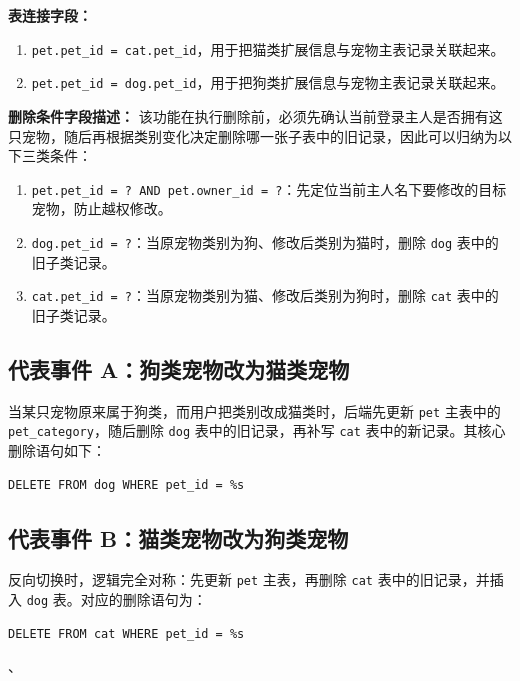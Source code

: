 \documentclass[12pt,a4paper,fontset=none]{ctexart}
\begin{document}
\textbf{表连接字段：}
\begin{enumerate}
    \item \texttt{pet.pet\_id = cat.pet\_id}，用于把猫类扩展信息与宠物主表记录关联起来。
    \item \texttt{pet.pet\_id = dog.pet\_id}，用于把狗类扩展信息与宠物主表记录关联起来。
\end{enumerate}

\textbf{删除条件字段描述：} 该功能在执行删除前，必须先确认当前登录主人是否拥有这只宠物，随后再根据类别变化决定删除哪一张子表中的旧记录，因此可以归纳为以下三类条件：
\begin{enumerate}
    \item \texttt{pet.pet\_id = ? AND pet.owner\_id = ?}：先定位当前主人名下要修改的目标宠物，防止越权修改。
    \item \texttt{dog.pet\_id = ?}：当原宠物类别为狗、修改后类别为猫时，删除 \texttt{dog} 表中的旧子类记录。
    \item \texttt{cat.pet\_id = ?}：当原宠物类别为猫、修改后类别为狗时，删除 \texttt{cat} 表中的旧子类记录。
\end{enumerate}

\subsection{代表事件 A：狗类宠物改为猫类宠物}
当某只宠物原来属于狗类，而用户把类别改成猫类时，后端先更新 \texttt{pet} 主表中的 \texttt{pet\_category}，随后删除 \texttt{dog} 表中的旧记录，再补写 \texttt{cat} 表中的新记录。其核心删除语句如下：
\begin{verbatim}
DELETE FROM dog WHERE pet_id = %s
\end{verbatim}

\subsection{代表事件 B：猫类宠物改为狗类宠物}
反向切换时，逻辑完全对称：先更新 \texttt{pet} 主表，再删除 \texttt{cat} 表中的旧记录，并插入 \texttt{dog} 表。对应的删除语句为：
\begin{verbatim}
DELETE FROM cat WHERE pet_id = %s
\end{verbatim}、
\end{document}
